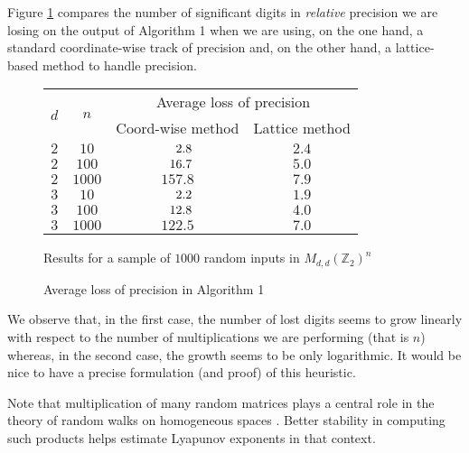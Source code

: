 \documentclass{sig-alternate-2013}
\newcommand{\Z}{\mathbb Z}
\begin{document}
\vspace{-1ex}\noindent\hrulefill

\medskip

\noindent
Figure \ref{fig:mulmatrix} compares the number of significant digits in 
\emph{relative} precision we are losing on the output of Algorithm 1 
when we are using, on the one hand, a standard coordinate-wise track of 
precision and, on the other hand, a lattice-based method to handle 
precision.
%
\begin{figure}
\begin{center}
\renewcommand{\arraystretch}{1.2}
\begin{tabular}{|c|c|c|c|}
\hline
\multirow{2}{*}{\hspace{0.2cm}$d$\hspace{0.2cm}} & 
\multirow{2}{*}{\hspace{0.2cm}$n$\hspace{0.2cm}} & 
\multicolumn{2}{|c|}{Average loss of precision} \\
\cline{3-4}
& & Coord-wise method & Lattice method \\
\hline 
$2$ & $10$ & $\hphantom{00}2.8$ & $2.4$ \\
$2$ & $100$ & $\hphantom{0}16.7$ & $5.0$ \\
$2$ & $1000$ & $157.8$ & $7.9$ \\
\hline
$3$ & $10$ & $\hphantom{00}2.2$ & $1.9$ \\
$3$ & $100$ & $\hphantom{0}12.8$ & $4.0$ \\
$3$ & $1000$ & $122.5$ & $7.0$ \\
\hline
\end{tabular}

\smallskip

{\small
Results for a sample of $1000$ random inputs in $M_{d,d}(\Z_2)^n$}
\end{center}
\renewcommand{\arraystretch}{1}

\vspace{-0.3cm}

\caption{Average loss of precision in Algorithm 1}
\label{fig:mulmatrix}
\end{figure}
%
We observe that, in the first case, the number of lost digits seems to 
grow linearly with respect to the number of multiplications we are 
performing (that is $n$) whereas, in the second case, the growth seems 
to be only logarithmic. It would be nice to have a precise formulation 
(and proof) of this heuristic.

Note that multiplication of many random matrices plays a central
role in the theory of random walks on homogeneous spaces \cite{Benoist:2012}.
Better stability in computing such products helps estimate
Lyapunov exponents in that context.
\end{document}
